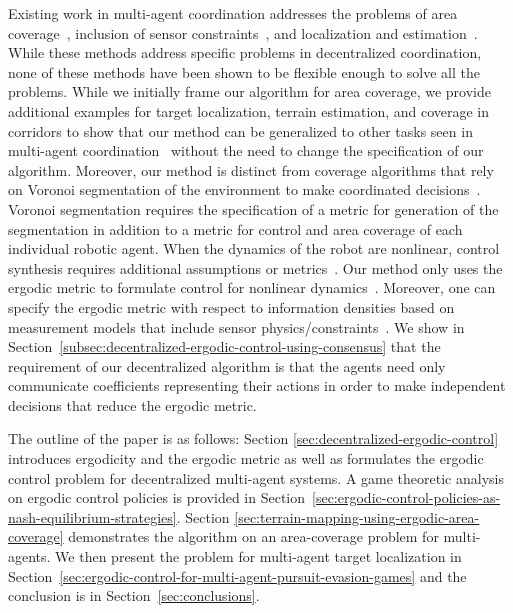 \documentclass[letterpaper, 10 pt, conference]{ieeeconf}  %
\begin{document}
Existing work in multi-agent coordination addresses the problems of area coverage~\cite{cortes2004coverage, lee2015multirobot, miah2017generalized}, inclusion of sensor constraints~\cite{kantaros2015distributed, vander2015algorithms}, and localization and estimation~\cite{freundlich2018distributed,vander2015algorithms}.
While these methods address specific problems in decentralized coordination, none of these methods have been shown to be flexible enough to solve all the problems.
While we initially frame our algorithm for area coverage, we provide additional examples for target localization, terrain estimation, and coverage in corridors to show that our method can be generalized to other tasks seen in multi-agent coordination~\cite{vander2015algorithms, freundlich2018distributed} without the need to change the specification of our algorithm.
Moreover, our method is distinct from coverage algorithms that rely on Voronoi segmentation of the environment to make coordinated decisions~\cite{kantaros2015distributed, cortes2004coverage, miah2017generalized, lee2015multirobot, alireza2011decentralized}.
Voronoi segmentation requires the specification of a metric for generation of the segmentation in addition to a metric for control and area coverage of each individual robotic agent.
When the dynamics of the robot are nonlinear, control synthesis requires additional assumptions or metrics~\cite{alireza2011decentralized, lee2015multirobot}.
Our method only uses the ergodic metric to formulate control for nonlinear dynamics~\cite{mavrommatiTRO2017realTime}.
Moreover, one can specify the ergodic metric with respect to information densities based on measurement models that include sensor physics/constraints~\cite{mavrommatiTRO2017realTime,miller2016ergodic}.
We show in Section~\ref{subsec:decentralized-ergodic-control-using-consensus} that the requirement of our decentralized algorithm is that the agents need only communicate coefficients representing their actions in order to make independent decisions that reduce the ergodic metric.

The outline of the paper is as follows: Section \ref{sec:decentralized-ergodic-control} introduces ergodicity and the ergodic metric as well as formulates the ergodic control problem for decentralized multi-agent systems. 
A game theoretic analysis on ergodic control policies is provided in Section~\ref{sec:ergodic-control-policies-as-nash-equilibrium-strategies}.
Section \ref{sec:terrain-mapping-using-ergodic-area-coverage} demonstrates the algorithm on an area-coverage problem for multi-agents. 
We then present the problem for multi-agent target localization in Section~\ref{sec:ergodic-control-for-multi-agent-pursuit-evasion-games} and the conclusion is in Section~\ref{sec:conclusions}.
\end{document}
